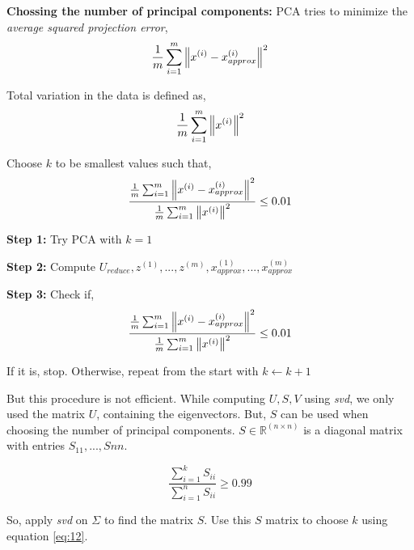 \noindent \textbf{Chossing the number of principal components: }
\noindent PCA tries to minimize the \emph{average squared projection error},
\begin{equation}
	\frac{1}{m} \sum_{i=1}^{m} \norm{x^{(i)} - x_{approx}^{(i)}}^2
\end{equation}

\noindent Total variation in the data is defined as,
\begin{equation}
	\frac{1}{m} \sum_{i=1}^{m} \norm{x^{(i)}}^2
\end{equation}

\noindent Choose $ k $ to be smallest values such that,
\begin{equation}
	\frac{\frac{1}{m} \sum_{i=1}^{m} \norm{x^{(i)} - x_{approx}^{(i)}}^2}
	{\frac{1}{m} \sum_{i=1}^{m} \norm{x^{(i)}}^2} \leq 0.01
\end{equation}
\noindent {}

\vspace{0.5cm}

\noindent \textbf{Step 1:} Try PCA with $ k = 1 $

\noindent \textbf{Step 2:} Compute $ U_{reduce}, z^{(1)}, ..., z^{(m)}, x_{approx}^{(1)}, ..., x_{approx}^{(m)} $

\noindent \textbf{Step 3:} Check if,
\begin{equation}
	\frac{\frac{1}{m} \sum_{i=1}^{m} \norm{x^{(i)} - x_{approx}^{(i)}}^2}
	{\frac{1}{m} \sum_{i=1}^{m} \norm{x^{(i)}}^2} \leq 0.01
\end{equation}

\noindent If it is, stop. Otherwise, repeat from the start with $ k \leftarrow k + 1 $

\vspace{0.5cm}

\noindent But this procedure is not efficient. While computing $ U, S, V $ using \emph{svd}, we only used
the matrix $ U $, containing the eigenvectors. But, $ S $ can be used when choosing the number of principal
components. $ S \in \mathbb{R}^{(n \times n)} $ is a diagonal matrix with entries $ S_{11} ,..., S{nn} $.

\begin{equation}
	\frac{\sum_{i=1}^{k} S_{ii}}{\sum_{i=1}^{n} S_{ii}} \geq 0.99
	\label{eq:12}
\end{equation}

\noindent So, apply \emph{svd} on $ \Sigma $ to find the matrix $ S $. Use this $ S $ matrix to choose $ k $
using equation \ref{eq:12}.

